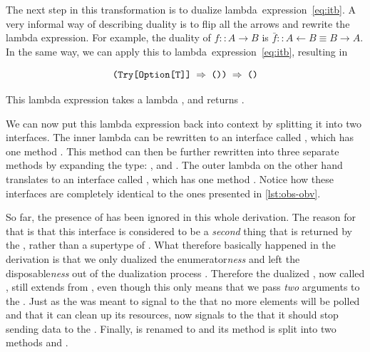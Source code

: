 The next step in this transformation is to dualize \cite{rydeheard1988-Category-Theory} lambda~expression~\ref{eq:itb}. A very informal way of describing duality is to flip all the arrows and rewrite the lambda expression. For example, the duality of $f :: A \rightarrow B$ is $\bar{f} :: A \leftarrow B \equiv B \rightarrow A$. In the same way, we can apply this to lambda~expression~\ref{eq:itb}, resulting in

\begin{equation} \label{eq:obs}
\code{(Try[Option[T]] $\Rightarrow$ ()) $\Rightarrow$ ()}
\end{equation}

This lambda expression takes a lambda , and returns .

We can now put this lambda expression back into context by splitting it into two interfaces. The inner lambda  can be rewritten to an interface called \obv, which has one method . This method can then be further rewritten into three separate methods by expanding the  type: ,  and . The outer lambda on the other hand translates to an interface called \obs, which has one method . Notice how these interfaces are completely identical to the ones presented in \autoref{lst:obs-obv}.


So far, the presence of \id has been ignored in this whole derivation. The reason for that is that this interface is considered to be a \emph{second} thing that is returned by the \ieb, rather than a supertype of \ier. What therefore basically happened in the derivation is that we only dualized the enumerator\textit{ness} and left the disposable\textit{ness} out of the dualization process \cite{E2E-Rx}. Therefore the dualized \ier, now called \obv, still extends from \id, even though this only means that we pass \textit{two} arguments to the . Just as the \id was meant to signal to the \ieb that no more elements will be polled and that it can clean up its resources, now \id signals to the \obs that it should stop sending data to the \obv. Finally, \id is renamed to \subs and its method  is split into two methods  and .

